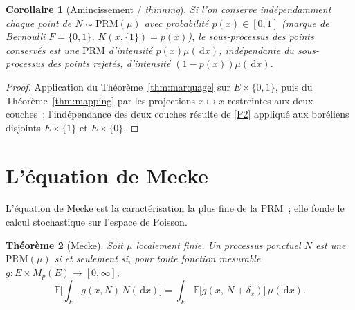 \documentclass[11pt,a4paper]{article}
\theoremstyle{plain}
\newtheorem{theoreme}{Théorème}[section]
\newtheorem{corollaire}[theoreme]{Corollaire}
\theoremstyle{definition}
\newcommand{\E}{\mathbb{E}}
\newcommand{\Mp}{M_p}
\newcommand{\dd}{\,\mathrm{d}}
\begin{document}
\begin{corollaire}[Amincissement / \emph{thinning}]
Si l'on conserve indépendamment chaque point de $N\sim\mathrm{PRM}(\mu)$ avec probabilité $p(x)\in[0,1]$ (marque de Bernoulli $F=\{0,1\}$, $K(x,\{1\})=p(x)$), le sous-processus des points conservés est une $\mathrm{PRM}$ d'intensité $p(x)\mu(\dd x)$, indépendante du sous-processus des points rejetés, d'intensité $(1-p(x))\mu(\dd x)$.
\end{corollaire}

\begin{proof}
Application du Théorème~\ref{thm:marquage} sur $E\times\{0,1\}$, puis du Théorème~\ref{thm:mapping} par les projections $x\mapsto x$ restreintes aux deux couches~; l'indépendance des deux couches résulte de \ref{P2} appliqué aux boréliens disjoints $E\times\{1\}$ et $E\times\{0\}$.
\end{proof}

\section{L'équation de Mecke}

L'équation de Mecke est la caractérisation la plus fine de la $\mathrm{PRM}$~; elle fonde le calcul stochastique sur l'espace de Poisson.

\begin{theoreme}[Mecke]\label{thm:mecke}
Soit $\mu$ localement finie. Un processus ponctuel $N$ est une $\mathrm{PRM}(\mu)$ si et seulement si, pour toute fonction mesurable $g:E\times\Mp(E)\to[0,\infty]$,
\begin{equation}\label{eq:mecke}
\E\Big[\int_E g(x,N)\,N(\dd x)\Big]
= \int_E \E\big[g(x,\,N+\delta_x)\big]\,\mu(\dd x).
\end{equation}
\end{theoreme}
\end{document}
